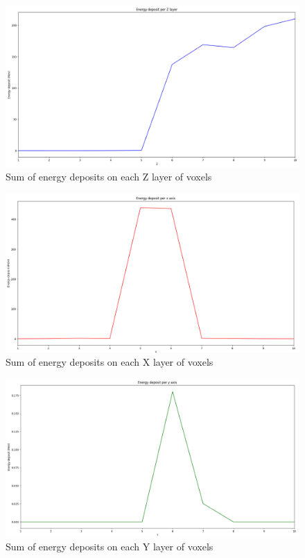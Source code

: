\documentclass[11pt,a4paper]{report}
\begin{document}
	\begin{center}
	\begin{figure}
		\includegraphics[scale=0.3]{imgs/edep_z_axis.png}
\centering
\caption{Sum of energy deposits on each Z layer of voxels}
	\end{figure}
\end{center}

\begin{center}
	\begin{figure}
		\includegraphics[scale=0.3]{imgs/edep_x_axis.png}
		\centering
		\caption{Sum of energy deposits on each X layer of voxels}
	\end{figure}
\end{center}

\begin{center}
	\begin{figure}
		\includegraphics[scale=0.3]{imgs/edep_y_axis.png}
		\centering
		\caption{Sum of energy deposits on each Y layer of voxels}
	\end{figure}
\end{center}
\end{document}
